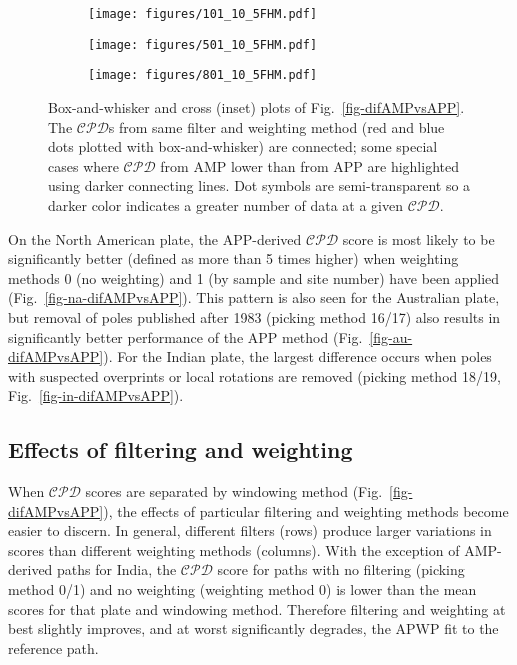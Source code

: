 \begin{figure*}
	\centering
	\begin{subfigure}{.9\textwidth}
		\texttt{[image: figures/101\_10\_5FHM.pdf]}
		\caption{}\label{fig-na-boxAMPvsAPP}
	\end{subfigure}
	\vspace{.1em}
	\begin{subfigure}{.9\textwidth}
		\texttt{[image: figures/501\_10\_5FHM.pdf]}
		\caption{}\label{fig-in-boxAMPvsAPP}
	\end{subfigure}
	\vspace{.1em}
	\begin{subfigure}{.9\textwidth}
		\texttt{[image: figures/801\_10\_5FHM.pdf]}
		\caption{}\label{fig-au-boxAMPvsAPP}
	\end{subfigure}
	\caption[]{Box-and-whisker and cross (inset) plots of
Fig.~\ref{fig-difAMPvsAPP}. The $\mathcal{CPD}$s from same filter and weighting
method (red and blue dots plotted with box-and-whisker) are connected; some
special cases where $\mathcal{CPD}$ from AMP lower than from APP are highlighted
using darker connecting lines. Dot symbols are semi-transparent so a darker
color indicates a greater number of data at a given
$\mathcal{CPD}$.}\label{fig-boxAMPvsAPP}
\end{figure*}

On the North American plate, the APP-derived $\mathcal{CPD}$ score is most
likely to be significantly better (defined as more than 5 times higher) when
weighting methods 0 (no weighting) and 1 (by sample and site number) have been
applied (Fig.~\ref{fig-na-difAMPvsAPP}). This pattern is also seen for the
Australian plate, but removal of poles published after 1983 (picking method
16/17) also results in significantly better performance of the APP method
(Fig.~\ref{fig-au-difAMPvsAPP}). For the Indian plate, the largest difference
occurs when poles with suspected overprints or local rotations are removed
(picking method 18/19, Fig.~\ref{fig-in-difAMPvsAPP}).

\subsection{Effects of filtering and weighting}

When $\mathcal{CPD}$ scores are separated by windowing method
(Fig.~\ref{fig-difAMPvsAPP}), the effects of particular filtering and weighting
methods become easier to discern. In general, different filters (rows) produce
larger variations in scores than different weighting methods (columns). With
the exception of AMP-derived paths for India, the $\mathcal{CPD}$ score for
paths with no filtering (picking method 0/1) and no weighting (weighting method
0) is lower than the mean scores for that plate and windowing method. Therefore
filtering and weighting at best slightly improves, and at worst significantly
degrades, the APWP fit to the reference path.

